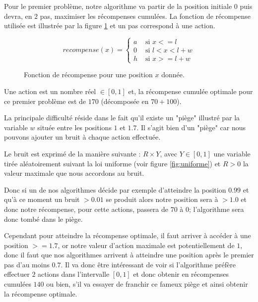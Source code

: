 \documentclass[pdftex,french, english]{article}	%
\begin{document}
   Pour le premier problème, notre algorithme va partir de la position initiale $0$ puis devra, en $2$ pas, maximiser les récompenses cumulées. La fonction de récompense utilisée est illustrée par la figure \ref{recompense1} et un pas correspond à une action.
	\begin{figure}[H]
      $$recompense(x) = \left\{
      \begin{array}{ll}
      a & \mbox{ si $x <= l$}\\
      0 & \mbox{ si $l < x < l + w$}\\
      h & \mbox{ si $x >= l + w$}
      \end{array}\right.$$
      \caption{Fonction de récompense pour une position $x$ donnée.}
      \label{recompense1}
    \end{figure}

	Une action est un nombre réel $\in [0, 1]$ et, la récompense cumulée optimale pour ce premier problème est de $170$ (décomposée en $70 + 100$).
    
    La principale difficulté réside dans le fait qu'il existe un "piège" illustré par la variable $w$ située entre les positions $1$ et $1.7$. 
    Il s'agit bien d'un "piège" car nous pouvons ajouter un bruit à chaque action effectuée. 
    
    Le bruit est exprimé de la manière suivante : $R \times Y$, avec $Y \in [0, 1]$ une variable tirée aléatoirement suivant la loi uniforme (voir figure \ref{fig:uniforme}) et $R > 0$ la valeur maximale que nous accordons au bruit.
    
    Donc si un de nos algorithmes décide par exemple d'atteindre la position $0.99$ et qu'à ce moment un bruit $>0.01$ se produit alors notre position sera à $> 1.0$ et donc notre récompense, pour cette actions, passera de $70$ à $0$; l'algorithme sera donc tombé dans le piège.
    
    Cependant pour atteindre la récompense optimale, il faut arriver à accéder à une position $>=1.7$, or notre valeur d'action maximale est potentiellement de $1$, donc il faut que nos algorithmes arrivent à atteindre une position après le premier pas d'au moins $0.7$. 
    Il va donc être intéressant de voir si l'algorithme préfère effectuer $2$ actions dans l'intervalle $[0,1]$ et donc obtenir en récompenses cumulées $140$ ou bien, s'il va essayer de franchir ce fameux piège et ainsi obtenir la récompense optimale.
    \\ 
    
\end{document}
